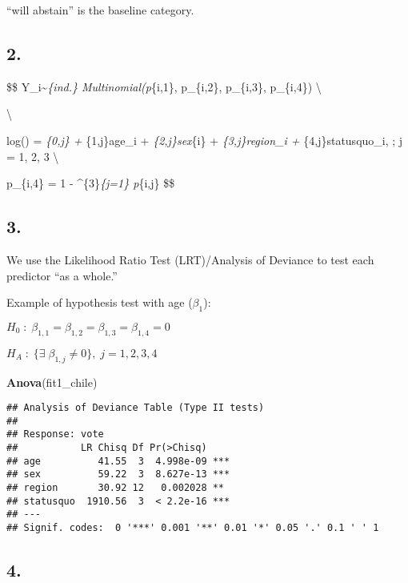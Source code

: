 \documentclass[
]{article}
\newenvironment{Shaded}{\begin{snugshade}}{\end{snugshade}}
\newcommand{\KeywordTok}[1]{\textcolor[rgb]{0.13,0.29,0.53}{\textbf{#1}}}
\newcommand{\NormalTok}[1]{#1}
\begin{document}
``will abstain'' is the baseline category.

\hypertarget{section-1}{%
\subsection{2.}\label{section-1}}

\$\$ Y\_i\sim\emph{\{ind.\} Multinomial(p}\{i,1\}, p\_\{i,2\},
p\_\{i,3\}, p\_\{i,4\}) \textbackslash{}

\textbackslash{}

log() = \beta\emph{\{0,j\} + \beta}\{1,j\}age\_i
+ \beta\emph{\{2,j\}sex}\{i\} + \beta\emph{\{3,j\}region\_i +
\beta}\{4,j\}statusquo\_i, ; j = 1, 2, 3 \textbackslash{}

p\_\{i,4\} = 1 - \sum\^{}\{3\}\emph{\{j=1\} p}\{i,j\} \$\$

\hypertarget{section-2}{%
\subsection{3.}\label{section-2}}

We use the Likelihood Ratio Test (LRT)/Analysis of Deviance to test each
predictor ``as a whole.''

Example of hypothesis test with age (\(\beta_1\)):

\(H_0 \; : \; \beta_{1,1} = \beta_{1,2} = \beta_{1,3} =\beta_{1,4} = 0\)

\(H_A \; : \; \{\exists \; \beta_{1,j} \neq 0\}, \; j = 1, 2, 3, 4\)

\begin{Shaded}
\begin{Highlighting}[]
\KeywordTok{Anova}\NormalTok{(fit1_chile)}
\end{Highlighting}
\end{Shaded}

\begin{verbatim}
## Analysis of Deviance Table (Type II tests)
## 
## Response: vote
##           LR Chisq Df Pr(>Chisq)    
## age          41.55  3  4.998e-09 ***
## sex          59.22  3  8.627e-13 ***
## region       30.92 12   0.002028 ** 
## statusquo  1910.56  3  < 2.2e-16 ***
## ---
## Signif. codes:  0 '***' 0.001 '**' 0.01 '*' 0.05 '.' 0.1 ' ' 1
\end{verbatim}

\hypertarget{section-3}{%
\subsection{4.}\label{section-3}}
\end{document}
